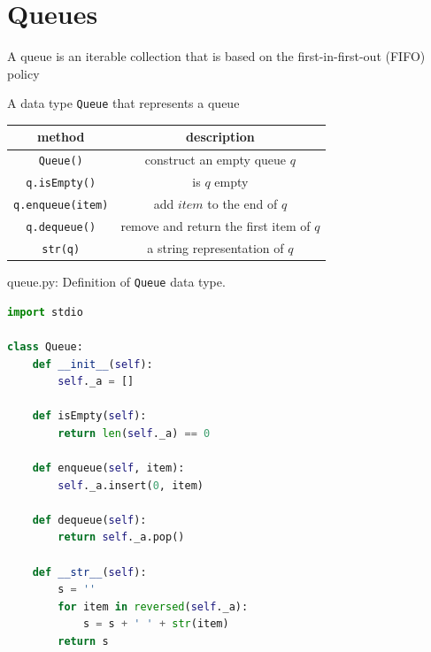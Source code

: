 \documentclass[8pt,a4paper,compress]{beamer}
\begin{document}
\section{Queues}

\begin{frame}[fragile]
\pause

A queue is an iterable collection that is based on the first-in-first-out (FIFO) policy

\pause
\bigskip

A data type \lstinline{Queue} that represents a queue
\begin{center}
\begin{tabular}{cc}
method & description \\ \hline
\lstinline$Queue()$ & construct an empty queue $q$ \\
\lstinline$q.isEmpty()$ & is $q$ empty \\
\lstinline$q.enqueue(item)$ & add $item$ to the end of $q$ \\
\lstinline$q.dequeue()$ &  remove and return the first item of $q$ \\
\lstinline$str(q)$ & a string representation of $q$
\end{tabular} 
\end{center}
\end{frame}

\begin{frame}[fragile]
\pause

\begin{framed}
\tiny queue.py: Definition of \lstinline{Queue} data type.
\end{framed}

\begin{lstlisting}[language=Python]
import stdio

class Queue:
    def __init__(self):
        self._a = []

    def isEmpty(self):
        return len(self._a) == 0

    def enqueue(self, item):
        self._a.insert(0, item)

    def dequeue(self):
        return self._a.pop()

    def __str__(self):
        s = ''
        for item in reversed(self._a):
            s = s + ' ' + str(item)
        return s
\end{lstlisting}
\end{frame}
\end{document}
